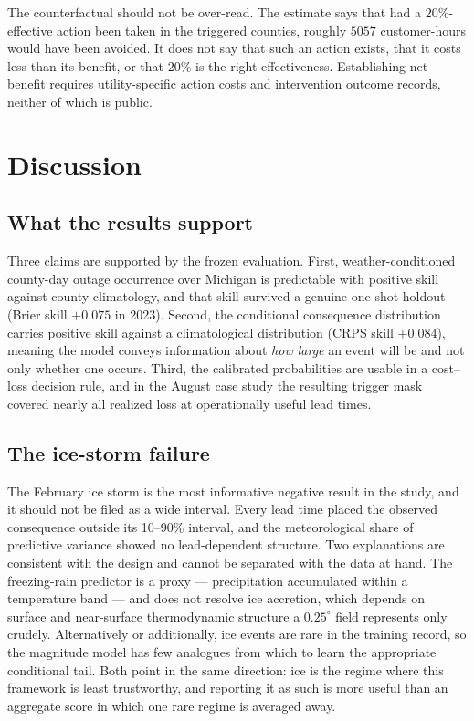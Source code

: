 \documentclass[10pt,twocolumn,letterpaper]{article}
\newcommand{\CH}{customer-hours}
\begin{document}
The counterfactual should not be over-read. The estimate says that had a
$20\%$-effective action been taken in the triggered counties, roughly
$\num{5057}$ \CH{} would have been avoided. It does not say that such an action
exists, that it costs less than its benefit, or that $20\%$ is the right
effectiveness. Establishing net benefit requires utility-specific action costs
and intervention outcome records, neither of which is public.

\section{Discussion}\label{sec:discussion}

\subsection{What the results support}

Three claims are supported by the frozen evaluation. First, weather-conditioned
county-day outage occurrence over Michigan is predictable with positive skill
against county climatology, and that skill survived a genuine one-shot holdout
(Brier skill $+0.075$ in 2023). Second, the conditional consequence
distribution carries positive skill against a climatological distribution
(CRPS skill $+0.084$), meaning the model conveys information about \emph{how
large} an event will be and not only whether one occurs. Third, the calibrated
probabilities are usable in a cost--loss decision rule, and in the August case
study the resulting trigger mask covered nearly all realized loss at
operationally useful lead times.

\subsection{The ice-storm failure}

The February ice storm is the most informative negative result in the study, and
it should not be filed as a wide interval. Every lead time placed the observed
consequence outside its 10--90\% interval, and the meteorological share of
predictive variance showed no lead-dependent structure. Two explanations are
consistent with the design and cannot be separated with the data at hand. The
freezing-rain predictor is a proxy --- precipitation accumulated within a
temperature band --- and does not resolve ice accretion, which depends on surface
and near-surface thermodynamic structure a $0.25^\circ$ field represents only
crudely. Alternatively or additionally, ice events are rare in the training
record, so the magnitude model has few analogues from which to learn the
appropriate conditional tail. Both point in the same direction: ice is the
regime where this framework is least trustworthy, and reporting it as such is
more useful than an aggregate score in which one rare regime is averaged away.
\end{document}
